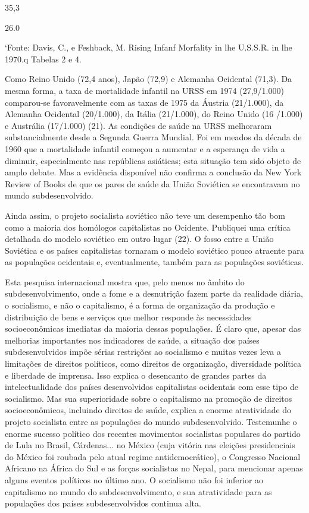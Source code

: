 \documentclass[twocolumn,amsmath,amssymb,aps,pre,floatfix]{revtex4-2}
\begin{document}
\par
35,3
\par
26.0
\par
‘Fonte: Davis, C., e Feshback, M. Rising Infanf Morfality in lhe U.S.S.R. in lhe 1970.q Tabelas 2 e 4.
\par
Como Reino Unido (72,4 anos), Japão (72,9) e Alemanha Ocidental (71,3). Da mesma forma, a taxa de mortalidade infantil na URSS em 1974 (27,9/1.000) comparou-se favoravelmente com as taxas de 1975 da Áustria (21/1.000), da Alemanha Ocidental (20/1.000), da Itália (21/1.000), do Reino Unido (16 /1.000) e Austrália (17/1.000) (21). As condições de saúde na URSS melhoraram substancialmente desde a Segunda Guerra Mundial. Foi em meados da década de 1960 que a mortalidade infantil começou a aumentar e a esperança de vida a diminuir, especialmente nas repúblicas asiáticas; esta situação tem sido objeto de amplo debate. Mas a evidência disponível não confirma a conclusão da New York Review of Books de que os pares de saúde da União Soviética se encontravam no mundo subdesenvolvido.
\par
Ainda assim, o projeto socialista soviético não teve um desempenho tão bom como a maioria dos homólogos capitalistas no Ocidente. Publiquei uma crítica detalhada do modelo soviético em outro lugar (22). O fosso entre a União Soviética e os países capitalistas tornaram o modelo soviético pouco atraente para as populações ocidentais e, eventualmente, também para as populações soviéticas.
\par
Esta pesquisa internacional mostra que, pelo menos no âmbito do subdesenvolvimento, onde a fome e a desnutrição fazem parte da realidade diária, o socialismo, e não o capitalismo, é a forma de organização da produção e distribuição de bens e serviços que melhor responde às necessidades socioeconômicas imediatas da maioria dessas populações. É claro que, apesar das melhorias importantes nos indicadores de saúde, a situação dos países subdesenvolvidos impõe sérias restrições ao socialismo e muitas vezes leva a limitações de direitos políticos, como direitos de organização, diversidade política e liberdade de imprensa. Isso explica o desencanto de grandes partes da intelectualidade dos países desenvolvidos capitalistas ocidentais com esse tipo de socialismo. Mas sua superioridade sobre o capitalismo na promoção de direitos socioeconômicos, incluindo direitos de saúde, explica a enorme atratividade do projeto socialista entre as populações do mundo subdesenvolvido. Testemunhe o enorme sucesso político dos recentes movimentos socialistas populares do partido de Lula no Brasil, Cárdenas... no México (cuja vitória nas eleições presidenciais do México foi roubada pelo atual regime antidemocrático), o Congresso Nacional Africano na África do Sul e as forças socialistas no Nepal, para mencionar apenas alguns eventos políticos no último ano. O socialismo não foi inferior ao capitalismo no mundo do subdesenvolvimento, e sua atratividade para as populações dos países subdesenvolvidos continua alta.
\par
\end{document}
